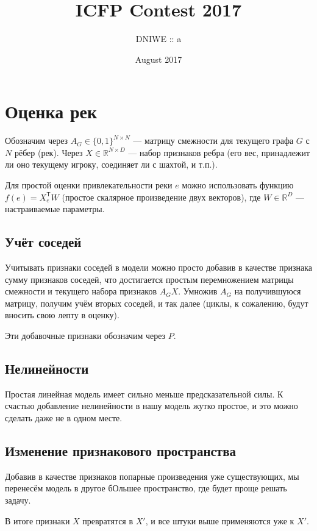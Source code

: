 \documentclass[14pt,a4paper]{article}
\title{ICFP Contest 2017}
\author{DNIWE :: a}
\date{August 2017}
\newcommand{\Tr}{\mathsf{\scriptstyle T}}
\def\RR{\mathbb{R}}
\begin{document}
\maketitle

\section{Оценка рек}

Обозначим через $ A_G \in \{0, 1\}^{N \times N} $ --- матрицу смежности для текущего графа $ G $ с $ N $ рёбер (рек).
Через $ X \in \RR^{N \times D} $ --- набор признаков ребра (его вес, принадлежит ли оно текущему игроку, соединяет ли с шахтой, и т.п.).

Для простой оценки привлекательности реки $ e $ можно использовать функцию $ f(e) = X_e^\Tr W $ (простое скалярное произведение двух векторов), где $ W \in \RR^{D} $  --- настраиваемые параметры.

\subsection{Учёт соседей}

Учитывать признаки соседей в модели можно просто добавив в качестве признака сумму признаков соседей, что достигается простым перемножением матрицы смежности и текущего набора признаков $ A_G X $.
Умножив $ A_G $ на получившуюся матрицу, получим учём вторых соседей, и так далее (циклы, к сожалению, будут вносить свою лепту в оценку).

Эти добавочные признаки обозначим через $ P $.

\subsection{Нелинейности}

Простая линейная модель имеет сильно меньше предсказательной силы.
К счастью добавление нелинейности в нашу модель жутко простое, и это можно сделать даже не в одном месте.

\subsection{Изменение признакового пространства}

Добавив в качестве признаков попарные произведения уже существующих, мы перенесём модель в другое бОльшее пространство, где будет проще решать задачу.

В итоге признаки $ X $ превратятся в $ X' $, и все штуки выше применяются уже к $ X' $.
\end{document}
